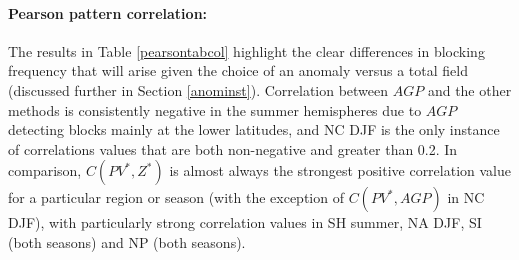 \documentclass[smallextended]{svjour3}       %
\numberwithin{equation}{section}
\begin{document}
\paragraph{Pearson pattern correlation:} The results in Table \ref{pearsontabcol} highlight the clear differences in blocking frequency that will arise given the choice of an anomaly versus a total field (discussed further in Section \ref{anominst}). Correlation between $AGP$ and the other methods is consistently negative in the summer hemispheres due to $AGP$ detecting blocks mainly at the lower latitudes, and NC DJF is the only instance of correlations values that are both non-negative and greater than 0.2. In comparison, $C(PV^*, Z^*)$ is almost always the strongest positive correlation value for a particular region or season (with the exception of $C(PV^*, AGP)$ in NC DJF), with particularly strong correlation values in SH summer, NA DJF, SI (both seasons) and NP (both seasons).

\end{document}
